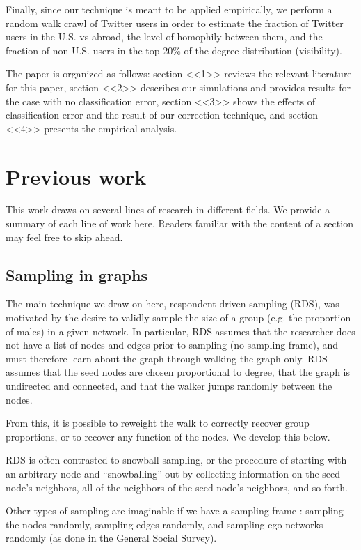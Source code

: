 \documentclass[a4paper]{article}
\begin{document}
Finally, since our technique is meant to be applied empirically, we perform a random walk crawl of Twitter users in order to estimate the fraction of Twitter users in the U.S. vs abroad, the level of homophily between them, and the fraction of non-U.S. users in the top 20\% of the degree distribution (visibility).

The paper is organized as follows: section <<1>> reviews the relevant literature for this paper, section <<2>> describes our simulations and provides results for the case with no classification error, section <<3>> shows the effects of classification error and the result of our correction technique, and section <<4>> presents the empirical analysis.

\section{Previous work}

This work draws on several lines of research in different fields. We provide a summary of each line of work here. Readers familiar with the content of a section may feel free to skip ahead.

\subsection{Sampling in graphs}

The main technique we draw on here, respondent driven sampling (RDS), was motivated by the desire to validly sample the size of a group (e.g. the proportion of males) in a given network. In particular, RDS assumes that the researcher does not have a list of nodes and edges prior to sampling (no sampling frame), and must therefore learn about the graph through walking the graph only. RDS assumes that the seed nodes are chosen proportional to degree, that the graph is undirected and connected, and that the walker jumps randomly between the nodes.

From this, it is possible to reweight the walk to correctly recover group proportions, or to recover any function of the nodes. We develop this below.

RDS is often contrasted to snowball sampling, or the procedure of starting with an arbitrary node and ``snowballing'' out by collecting information on the seed node's neighbors, all of the neighbors of the seed node's neighbors, and so forth.

Other types of sampling are imaginable if we have a sampling frame \cite{karimi_visibility_2017}: sampling the nodes randomly, sampling edges randomly, and sampling ego networks randomly (as done in the General Social Survey).
\end{document}
